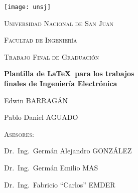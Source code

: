 \begin{titlepage}
	{\centering
	\texttt{[image: unsj]}
	
	\vspace{1cm}
	
	{\scshape\LARGE Universidad Nacional de San Juan}
	
	{\scshape\LARGE Facultad de Ingeniería}
	
	\vspace{1cm}
	
	{\scshape\Large Trabajo Final de Graduación}
	
	\vspace{1.5cm}
	
	{\Huge\bfseries Plantilla de \LaTeX~para los trabajos\\finales de Ingeniería Electrónica}
		
	\vspace{2cm}
	
	{\Large Edwin BARRAGÁN\par}
	{\Large Pablo Daniel AGUADO\par}
	\vfill}


\centering
		{\textsc{Asesores:}}
		
{Dr.~Ing.~Germán Alejandro GONZÁLEZ}
		
{Dr.~Ing.~Germán Emilio MAS}

{Dr.~Ing.~Fabricio \enquote{Carlos} EMDER}

	
	\vfill
	
	\centering
	{\large\the\year}
\end{titlepage}